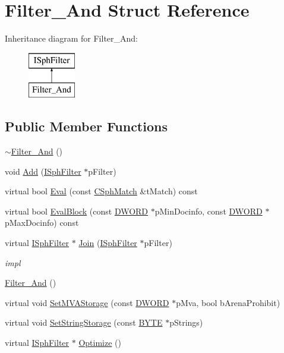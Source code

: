 \hypertarget{structFilter__And}{\section{Filter\-\_\-\-And Struct Reference}
\label{structFilter__And}
}
Inheritance diagram for Filter\-\_\-\-And\-:\begin{figure}[H]
\begin{center}
\leavevmode
\includegraphics[height=2.000000cm]{structFilter__And}
\end{center}
\end{figure}
\subsection*{Public Member Functions}
\begin{DoxyCompactItemize}
\item 
\hyperlink{structFilter__And_a5db9ed197da53658feba5176573a988d}{$\sim$\-Filter\-\_\-\-And} ()
\item 
void \hyperlink{structFilter__And_ab652036f6d66a16b00011fd6f6b2377e}{Add} (\hyperlink{structISphFilter}{I\-Sph\-Filter} $\ast$p\-Filter)
\item 
virtual bool \hyperlink{structFilter__And_a6d01f314669df4b30ae49c4261e8b304}{Eval} (const \hyperlink{classCSphMatch}{C\-Sph\-Match} \&t\-Match) const 
\item 
virtual bool \hyperlink{structFilter__And_a7247b0474bd93a6591039b1fd33a9a72}{Eval\-Block} (const \hyperlink{sphinxstd_8h_a798af1e30bc65f319c1a246cecf59e39}{D\-W\-O\-R\-D} $\ast$p\-Min\-Docinfo, const \hyperlink{sphinxstd_8h_a798af1e30bc65f319c1a246cecf59e39}{D\-W\-O\-R\-D} $\ast$p\-Max\-Docinfo) const 
\item 
virtual \hyperlink{structISphFilter}{I\-Sph\-Filter} $\ast$ \hyperlink{structFilter__And_a9652e785d326fa81fcb4670304614515}{Join} (\hyperlink{structISphFilter}{I\-Sph\-Filter} $\ast$p\-Filter)
\begin{DoxyCompactList}\small\item\em impl \end{DoxyCompactList}\item 
\hyperlink{structFilter__And_aa35fed4c51998072f7f87b48b826f1bc}{Filter\-\_\-\-And} ()
\item 
virtual void \hyperlink{structFilter__And_a419297791c8e094853b755d223264d37}{Set\-M\-V\-A\-Storage} (const \hyperlink{sphinxstd_8h_a798af1e30bc65f319c1a246cecf59e39}{D\-W\-O\-R\-D} $\ast$p\-Mva, bool b\-Arena\-Prohibit)
\item 
virtual void \hyperlink{structFilter__And_a73f529a0d2a74de73ec155730386af2c}{Set\-String\-Storage} (const \hyperlink{sphinxstd_8h_a4ae1dab0fb4b072a66584546209e7d58}{B\-Y\-T\-E} $\ast$p\-Strings)
\item 
virtual \hyperlink{structISphFilter}{I\-Sph\-Filter} $\ast$ \hyperlink{structFilter__And_a035dce91b7b174ef982008448064474e}{Optimize} ()
\end{DoxyCompactItemize}

